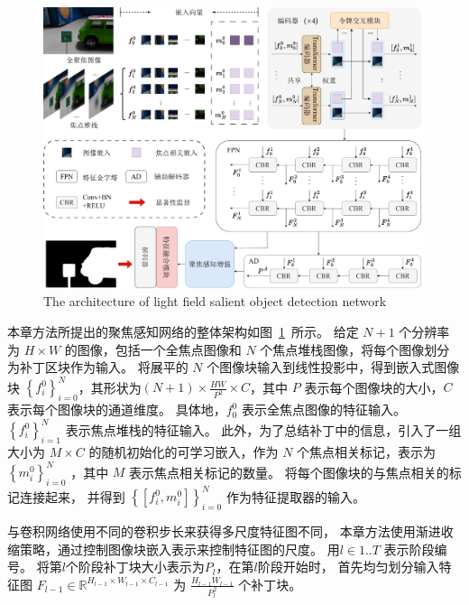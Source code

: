 

\begin{figure}[!ht]
	\centering
	\includegraphics[width=0.95\linewidth]{figures/chapter3/overview_1}
	{The architecture of light field salient object detection network}  
	\label{cpt3_fig1:overview}
\end{figure}




本章方法所提出的聚焦感知网络的整体架构如图~\ref{cpt3_fig1:overview}~所示。
给定 $N + 1$ 个分辨率为 $ H \times W $ 的图像，包括一个全焦点图像和 $N$ 个焦点堆栈图像，将每个图像划分为补丁区块作为输入。 
将展平的 $N$ 个图像块输入到线性投影中，得到嵌入式图像块 $ \left \{ f_{i}^{0} \right \}_{i=0}^{N} $，其形状为$ \left ( N + 1 \right ) \times \frac{HW}{P^{2}} \times C  $，其中 $P$ 表示每个图像块的大小，$C$ 表示每个图像块的通道维度。 
%
%
%
具体地，$ f_{0}^{0} $ 表示全焦点图像的特征输入。 
$ \left \{ f_{i}^{0} \right \}_{i=1}^{N} $ 表示焦点堆栈的特征输入。 
此外，为了总结补丁中的信息，引入了一组大小为 $ M \times C $ 的随机初始化的可学习嵌入，作为 $N$ 个焦点相关标记，表示为 $ \left \{ m_{i}^{0} \right \}_{i=0}^{N} $ ，其中 $M$ 表示焦点相关标记的数量。 
将每个图像块的与焦点相关的标记连接起来，
并得到 $ \left \{ \left [ f_{i}^{0},m_{i}^{0}  \right ]  \right \}_{i=0}^{N} $ 作为特征提取器的输入。 




与卷积网络使用不同的卷积步长来获得多尺度特征图不同，
本章方法使用渐进收缩策略，通过控制图像块嵌入表示来控制特征图的尺度。
用$ l \in 1..T $ 表示阶段编号。 
将第$l$个阶段补丁块大小表示为$P_{l}$，在第$l$阶段开始时，
首先均匀划分输入特征图
$F_{l-1} \in \mathbb{R}^{H_{l-1} \times W_{l-1} \times C_{l-1}}$
为
$ \frac{H_{l-1}W_{l-1}}{P_{l}^{2}} $
个补丁块。




